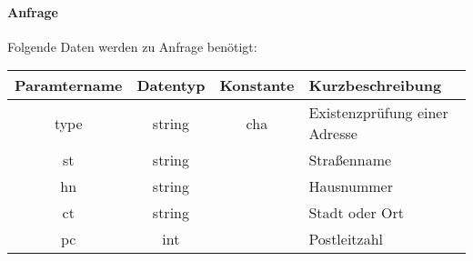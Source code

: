 \paragraph{Anfrage}Folgende Daten werden zu Anfrage benötigt:
\begin{table}[H]
	\begin{tabular}{|c|c|c|p{6.5cm}|}
		\hline
		\textbf{Paramtername} & \textbf{Datentyp} & \textbf{Konstante} & \textbf{Kurzbeschreibung}                                                                                               \\ \hline
		type                & string            & cha                & Existenzprüfung einer Adresse \\ \hline
		st                  & string            &                    & Straßenname \\ \hline
		hn                  & string            &                    & Hausnummer \\ \hline
		ct                  & string            &                    & Stadt oder Ort \\ \hline
		pc                  & int               &                    & Postleitzahl \\ \hline
	\end{tabular}
\end{table}
